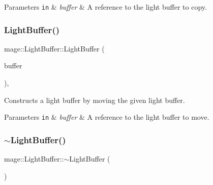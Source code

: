 \begin{DoxyParams}[1]{Parameters}
\mbox{\tt in}  & {\em buffer} & A reference to the light buffer to copy. \\
\hline
\end{DoxyParams}
\hypertarget{structmage_1_1_light_buffer_aefffd7152e1b54cd069d6e8e1fdcedcd}{}\label{structmage_1_1_light_buffer_aefffd7152e1b54cd069d6e8e1fdcedcd} 
\subsubsection{\texorpdfstring{Light\+Buffer()}{LightBuffer()}\hspace{0.1cm}{\footnotesize\ttfamily [3/3]}}
{\footnotesize\ttfamily mage\+::\+Light\+Buffer\+::\+Light\+Buffer (\begin{DoxyParamCaption}\item[{\hyperlink{structmage_1_1_light_buffer}{Light\+Buffer} \&\&}]{buffer }\end{DoxyParamCaption})\hspace{0.3cm}{\ttfamily [default]}, {\ttfamily [noexcept]}}

Constructs a light buffer by moving the given light buffer.


\begin{DoxyParams}[1]{Parameters}
\mbox{\tt in}  & {\em buffer} & A reference to the light buffer to move. \\
\hline
\end{DoxyParams}
\hypertarget{structmage_1_1_light_buffer_a0dc88c8ad1721b4b545c65c26c2fec69}{}\label{structmage_1_1_light_buffer_a0dc88c8ad1721b4b545c65c26c2fec69} 
\subsubsection{\texorpdfstring{$\sim$\+Light\+Buffer()}{~LightBuffer()}}
{\footnotesize\ttfamily mage\+::\+Light\+Buffer\+::$\sim$\+Light\+Buffer (\begin{DoxyParamCaption}{ }\end{DoxyParamCaption})\hspace{0.3cm}{\ttfamily [default]}}

